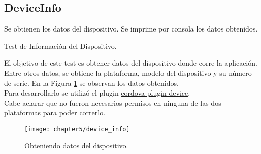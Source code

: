 \subsection{DeviceInfo}
\begin{algorithm}
	\begin{algorithmic}[1]
		\STATE Se obtienen los datos del dispositivo.
		\STATE Se imprime por consola los datos obtenidos.
	\end{algorithmic}
	\caption{Test de Información del Dispositivo.}\label{alg:chap5_test_info}
\end{algorithm}
El objetivo de este test es obtener datos del dispositivo donde corre la aplicación. Entre otros datos, se obtiene la plataforma, modelo del dispositivo y su número de serie. En la Figura \ref{fig:ch05:device-info} se observan los datos obtenidos.\\
Para desarrollarlo se utilizó el plugin \href{https://www.npmjs.com/package/cordova-plugin-device}{cordova-plugin-device}.\\
Cabe aclarar que no fueron necesarios permisos en ninguna de las dos plataformas para poder correrlo.
\begin{figure}[hbtp]
   \centering
	\texttt{[image: chapter5/device\_info]}
	\caption{Obteniendo datos del dispositivo.}
	\label{fig:ch05:device-info}
\end{figure}
